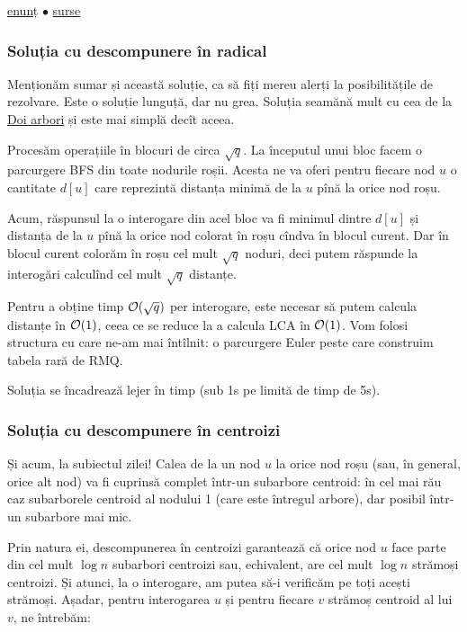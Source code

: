 \documentclass[../main.tex]{subfiles}
\begin{document}
\href{https://codeforces.com/contest/342/problem/E}{enunț}
$\bullet$
\hyperref[code:xenia-and-tree]{surse}

\subsubsection*{Soluția cu descompunere în radical}

Menționăm sumar și această soluție, ca să fiți mereu alerți la posibilitățile de rezolvare. Este o soluție lunguță, dar nu grea. Soluția seamănă mult cu cea de la \hyperref[problem:doi-arbori]{Doi arbori} și este mai simplă decît aceea.

Procesăm operațiile în blocuri de circa $\sqrt{q}$. La începutul unui bloc facem o parcurgere BFS din toate nodurile roșii. Acesta ne va oferi pentru fiecare nod $u$ o cantitate $d[u]$ care reprezintă distanța minimă de la $u$ pînă la orice nod roșu.

Acum, răspunsul la o interogare din acel bloc va fi minimul dintre $d[u]$ și distanța de la $u$ pînă la orice nod colorat în roșu cîndva în blocul curent. Dar în blocul curent colorăm în roșu cel mult $\sqrt{q}$ noduri, deci putem răspunde la interogări calculînd cel mult $\sqrt{q}$ distanțe.

Pentru a obține timp $\mathcal{O}(\sqrt{q})$ per interogare, este necesar să putem calcula distanțe în $\mathcal{O}(1)$, ceea ce se reduce la a calcula LCA în $\mathcal{O}(1)$. Vom folosi structura cu care ne-am mai întîlnit: o parcurgere Euler peste care construim tabela rară de RMQ.

Soluția se încadrează lejer în timp (sub 1s pe limită de timp de 5s).

\subsubsection*{Soluția cu descompunere în centroizi}

Și acum, la subiectul zilei! Calea de la un nod $u$ la orice nod roșu (sau, în general, orice alt nod) va fi cuprinsă complet într-un subarbore centroid: în cel mai rău caz subarborele centroid al nodului 1 (care este întregul arbore), dar posibil într-un subarbore mai mic.

Prin natura ei, descompunerea în centroizi garantează că orice nod $u$ face parte din cel mult $\log n$ subarbori centroizi sau, echivalent, are cel mult $\log n$ strămoși centroizi. Și atunci, la o interogare, am putea să-i verificăm pe toți acești strămoși. Așadar, pentru interogarea $u$ și pentru fiecare $v$ strămoș centroid al lui $v$, ne întrebăm:
\end{document}
